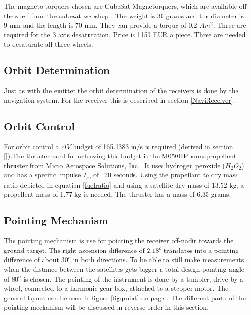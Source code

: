 The magneto torquers chosen are CubeSat Magnetorquers, which are available off the shelf from the cubesat webshop \cite{cubesatshop}. The weight is 30 grams and the diameter is 9 mm and the length is 70 mm. They can provide a torque of 0.2 $Am^2$. Three are required for the 3 axis desaturation. Price is 1150 EUR a piece. Three are needed to desaturate all three wheels.

\subsection{Orbit Determination}
\label{ss:recDDods}
Just as with the emitter the orbit determination of the receivers is done by the navigation system. For the receiver this is described in section \ref{NaviReceiver}.

\subsection{Orbit Control}
\label{ss:recDDocs}
For orbit control a $\Delta V$ budget of 165.1383 m/s is required (derived in section \ref{}).The thruster used for achieving this budget is the M050HP monopropellent thruster from Micro Aerospace Solutions, Inc \cite{h2o2thruster}. It uses hydrogen peroxide ($H_2O_2$) and has a specific impulse $I_{sp}$ of 120 seconds. Using the propellant to dry mass ratio depicted in equation \ref{fuelratio} and using a satellite dry mass of  13.52 kg, a propellent mass of  1.77 kg is needed. The thruster has a mass of 6.35 grams.

\subsection{Pointing Mechanism}
\label{ss:recDDpoint}
The pointing mechanism is use for pointing the receiver off-nadir towards the ground target. The right ascension difference of $2.18^o$ translates into a pointing difference of about $30^o$ in both directions. To be able to still make measurements when the distance between the satellites gets bigger a total design pointing angle of $80^o$ is chosen. The pointing of the instrument is done by a tumbler, drive by a wheel, connected to a harmonic gear box, attached to a stepper motor. The general layout can be seen in figure \ref{fig:point} on page \pageref{fig:point}. The different parts of the pointing mechanism will be discussed in reverse order in this section.

